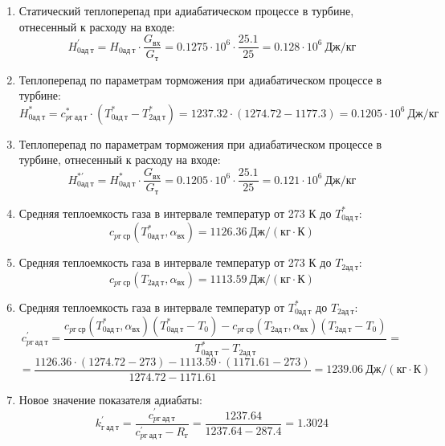 \documentclass[a4paper,10pt]{article}
\begin{document}
\begin{enumerate}
        \item Статический теплоперепад при адиабатическом процессе в турбине, отнесенный к расходу на входе:
        \[
            H_{0ад\ т}^\prime = H_{0ад\ т} \cdot \frac{ G_{вх} }{ G_т }  =
                0.1275 \cdot 10^6 \cdot
                \frac{ 25.1 }{ 25 } =
            0.128 \cdot 10^6 \ Дж/кг
        \]

        \item Теплоперепад по параметрам торможения при адиабатическом процессе в турбине:
        \[
            H_{0ад\ т}^* = c_{pг\ ад\ т}^* \cdot \left(
            T_{0ад\ т}^* - T_{2ад\ т}^*
            \right) =
            1237.32 \cdot \left(
            1274.72 - 1177.3
            \right) =
            0.1205 \cdot 10^6 \ Дж/кг
        \]

        \item Теплоперепад по параметрам торможения при адиабатическом процессе в турбине, отнесенный к расходу на входе:
        \[
            H_{0ад\ т}^{*\prime} = H_{0ад\ т}^* \cdot \frac{ G_{вх} }{ G_т }  =
                0.1205 \cdot 10^6 \cdot
                \frac{ 25.1 }{ 25 } =
            0.121 \cdot 10^6 \ Дж/кг
        \]

        \item Средняя теплоемкость газа в интервале температур от 273 К до $T_{0ад\ т}^*$:
        \[
            c_{pг\ ср} (T_{0ад\ т}^*, \alpha_{вх}) =
            1126.36 \ Дж/(кг \cdot К)
        \]

        \item Средняя теплоемкость газа в интервале температур от 273 К до $T_{2ад\ т}$:
        \[
            c_{pг\ ср} (T_{2ад\ т}, \alpha_{вх}) =
            1113.59 \ Дж/(кг \cdot К)
        \]

        \item Средняя теплоемкость газа в интервале температур от $T_{0ад\ т}^*$ до $T_{2ад\ т}$:
        \[
            c_{pг\ ад\ т}^\prime = \frac{
		        c_{pг\ ср} (T_{0ад\ т}^*, \alpha_{вх}) (T_{0ад\ т}^* - T_0) - c_{pг\ ср} (T_{2ад\ т}, \alpha_{вх})(T_{2ад\ т} - T_0)
		    }{
		        T_{0ад\ т}^* - T_{2ад\ т}} =\]
        \[    =\frac{
		        1126.36 \cdot
                (1274.72 - 273) -
		        1113.59 \cdot
                (1171.61 - 273)
		    }{
		        1274.72 - 1171.61} =
		    1239.06 \ Дж / (кг \cdot К)
        \]

        \item Новое значение показателя адиабаты:
        \[
            k_{г\ ад\ т}^\prime = \frac{c_{pг\ ад\ т}^\prime}{c_{pг\ ад\ т}^\prime - R_г} =
                \frac{
                    1237.64
                }{
                    1237.64 - 287.4
                }
            = 1.3024
        \]


\end{enumerate}
\end{document}

